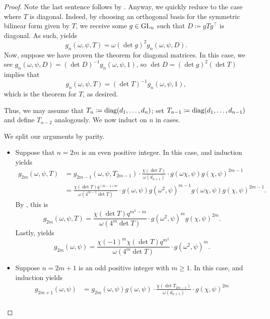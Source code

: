 \begin{proof}
    Note the last sentence follows by . Anyway, we quickly reduce to the case where $T$ is diagonal. Indeed, by choosing an orthogonal basis for the symmetric bilinear form given by $T$, we receive some $g\in\mathrm{GL}_n$ such that $D\coloneqq gTg^\intercal$ is diagonal. As such,  yields
    \[g_n(\omega,\psi,T) = \omega(\det g)^2g_n(\omega,\psi,D).\]
    Now, suppose we have proven the theorem for diagonal matrices. In this case, we see $g_n(\omega,\psi,D)=(\det D)^{-1}g_n(\omega,\psi,1)$, so $\det D=(\det g)^2(\det T)$ implies that
    \[g_n(\omega,\psi,T)=(\det T)^{-1}g_n(\omega,\psi,1),\]
    which is the theorem for $T$, as desired.

    Thus, we may assume that $T_n\coloneqq\operatorname{diag}(d_1,\ldots,d_n)$; set $T_{n-1}\coloneqq\operatorname{diag}(d_1,\ldots,d_{n-1})$ and define $T_{n-2}$ analogously. We now induct on $n$ in cases.
    \begin{listalph}
        \item We split our arguments by parity.
        \begin{itemize}
            \item Suppose that $n=2m$ is an even positive integer. In this case,  and induction yields
            \begin{align*}
                g_{2m}(\omega,\psi,T) &= g_{2m-1}(\omega,\psi,T_{2m-1})\cdot\frac{\chi(\det T)}{\omega(d_{n+1})}\cdot g(\omega\chi,\psi)g(\chi,\psi)^{2m-1} \\
                &= \frac{\chi(\det T)q^{(m-1)m}}{\omega(4^{m-1}\det T)}\cdot g(\omega,\psi)g\left(\omega^2,\psi\right)^{m-1}g(\omega\chi,\psi)g(\chi,\psi)^{2m-1}.
            \end{align*}
            By , this is
            \[g_{2m}(\omega,\psi,T)=\frac{\chi(\det T)q^{m^2-m}}{\omega(4^m\det T)}\cdot g\left(\omega^2,\psi\right)^mg(\chi,\psi)^{2m}.\]
            Lastly,  yields
            \[g_{2m}(\omega,\psi)=\frac{\chi(-1)^m\chi(\det T)q^{m^2}}{\omega(4^m\det T)}\cdot g\left(\omega^2,\psi\right)^m.\]
            \item Suppose $n=2m+1$ is an odd positive integer with $m\ge1$. In this case,  and induction yields
            \begin{align*}
                g_{2m+1}(\omega,\psi) &= g_{2m}(\omega,\psi)g(\omega,\psi)\cdot\frac{\chi(\det T_{2m-1})}{\omega(d_{n+1})}\cdot g(\chi,\psi)^{2m} \\

\end{align*}
\end{itemize}
\end{listalph}
\end{proof}
